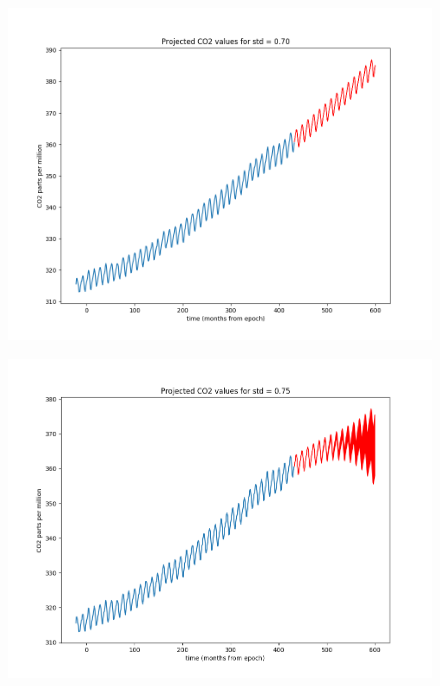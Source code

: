 \documentclass[a4paper]{article}
\begin{document}
\begin{figure}[p]
\begin{minipage}[b]{0.5\textwidth}
\centering
\includegraphics[width=\textwidth]{std70}
\label{fig:std70}
\end{minipage}%
\begin{minipage}[b]{0.5\textwidth}
\centering
\includegraphics[width=\textwidth]{std75}
\label{fig:std75}
\end{minipage}
\end{figure}      
\end{document}

